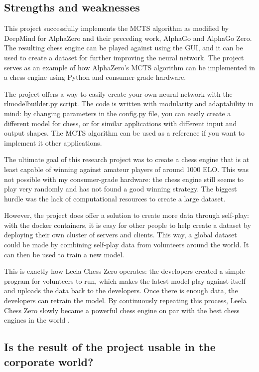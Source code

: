 \documentclass{article}
\begin{document}
\subsection{Strengths and weaknesses}

This project successfully implements the MCTS algorithm as modified by DeepMind for AlphaZero and their preceding work,
AlphaGo and AlphaGo Zero. The resulting chess engine can be played against using the GUI, and it can be used to create
a dataset for further improving the neural network. The project serves as an example of how AlphaZero's MCTS algorithm 
can be implemented in a chess engine using Python and consumer-grade hardware. 

The project offers a way to easily create your own neural network with the rlmodelbuilder.py script.
The code is written with modularity and adaptability in mind: by changing parameters in the config.py file, 
you can easily create a different model for chess, or for similar applications with different input and output shapes. 
The MCTS algorithm can be used as a reference if you want to implement it other applications.

The ultimate goal of this research project was to create a chess engine that is at least capable of winning
against amateur players of around 1000 ELO. This was not possible with my consumer-grade hardware: 
the chess engine still seems to play very randomly and has not found a good winning strategy. 
The biggest hurdle was the lack of computational resources to create a large dataset.

However, the project does offer a solution to create more data through self-play: with the docker containers, 
it is easy for other people to help create a dataset by deploying their own cluster of servers and clients. 
This way, a global dataset could be made by combining self-play data from volunteers around the world. 
It can then be used to train a new model. 

This is exactly how Leela Chess Zero operates: the developers created a simple program for volunteers to run,
which makes the latest model play against itself and uploads the data back to the developers. Once there is
enough data, the developers can retrain the model. By continuously repeating this process, Leela Chess Zero
slowly became a powerful chess engine on par with the best chess engines in the world \cite{TopChessEngine2022}.

\subsection{Is the result of the project usable in the corporate world?}
\end{document}
